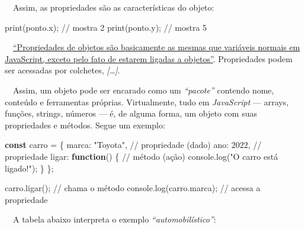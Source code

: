 \documentclass[
  portuguese,
  letterpaper,
  DIV=11,
  numbers=noendperiod]{scrreprt}
\newenvironment{Shaded}{\begin{snugshade}}{\end{snugshade}}
\newcommand{\AttributeTok}[1]{\textcolor[rgb]{0.40,0.45,0.13}{#1}}
\newcommand{\BuiltInTok}[1]{\textcolor[rgb]{0.00,0.23,0.31}{#1}}
\newcommand{\CommentTok}[1]{\textcolor[rgb]{0.37,0.37,0.37}{#1}}
\newcommand{\DataTypeTok}[1]{\textcolor[rgb]{0.68,0.00,0.00}{#1}}
\newcommand{\DecValTok}[1]{\textcolor[rgb]{0.68,0.00,0.00}{#1}}
\newcommand{\ErrorTok}[1]{\textcolor[rgb]{0.68,0.00,0.00}{#1}}
\newcommand{\FunctionTok}[1]{\textcolor[rgb]{0.28,0.35,0.67}{#1}}
\newcommand{\KeywordTok}[1]{\textcolor[rgb]{0.00,0.23,0.31}{\textbf{#1}}}
\newcommand{\NormalTok}[1]{\textcolor[rgb]{0.00,0.23,0.31}{#1}}
\newcommand{\OperatorTok}[1]{\textcolor[rgb]{0.37,0.37,0.37}{#1}}
\newcommand{\SpecialCharTok}[1]{\textcolor[rgb]{0.37,0.37,0.37}{#1}}
\newcommand{\StringTok}[1]{\textcolor[rgb]{0.13,0.47,0.30}{#1}}
\begin{document}
\hfill\break

~~Assim, as propriedades são as características do objeto:

\begin{Shaded}
\begin{Highlighting}[]
\FunctionTok{print}\NormalTok{(ponto.x);  }\SpecialCharTok{/}\ErrorTok{/}\NormalTok{ mostra }\DecValTok{2}
\FunctionTok{print}\NormalTok{(ponto.y);  }\SpecialCharTok{/}\ErrorTok{/}\NormalTok{ mostra }\DecValTok{5}
\end{Highlighting}
\end{Shaded}

~~\href{https://developer.mozilla.org/pt-BR/docs/Web/JavaScript/Guide/Working_with_objects}{``Propriedades
de objetos são basicamente as mesmas que variáveis normais em
JavaScript, exceto pelo fato de estarem ligadas a objetos''}.
Propriedades podem ser acessadas por colchetes, \emph{{[}\ldots{]}}.

~~Assim, um objeto pode ser encarado como um \emph{``pacote''} contendo
nome, conteúdo e ferramentas próprias. Virtualmente, tudo em
\emph{JavaScript} --- arrays, funções, strings, números --- é, de alguma
forma, um objeto com suas propriedades e métodos. Segue um exemplo:

\hfill\break

\begin{Shaded}
\begin{Highlighting}[]
\KeywordTok{const}\NormalTok{ carro }\OperatorTok{=}\NormalTok{ \{}
  \DataTypeTok{marca}\OperatorTok{:} \StringTok{"Toyota"}\OperatorTok{,}        \CommentTok{// propriedade (dado)}
  \DataTypeTok{ano}\OperatorTok{:} \DecValTok{2022}\OperatorTok{,}              \CommentTok{// propriedade}
  \DataTypeTok{ligar}\OperatorTok{:} \KeywordTok{function}\NormalTok{() \{     }\CommentTok{// método (ação)}
    \BuiltInTok{console}\OperatorTok{.}\FunctionTok{log}\NormalTok{(}\StringTok{"O carro está ligado!"}\NormalTok{)}\OperatorTok{;}
\NormalTok{  \}}
\NormalTok{\}}\OperatorTok{;}

\NormalTok{carro}\OperatorTok{.}\FunctionTok{ligar}\NormalTok{()}\OperatorTok{;}            \CommentTok{// chama o método}
\BuiltInTok{console}\OperatorTok{.}\FunctionTok{log}\NormalTok{(carro}\OperatorTok{.}\AttributeTok{marca}\NormalTok{)}\OperatorTok{;} \CommentTok{// acessa a propriedade}
\end{Highlighting}
\end{Shaded}

\hfill\break

~~A tabela abaixo interpreta o exemplo \emph{``automobilístico''}:
\end{document}
